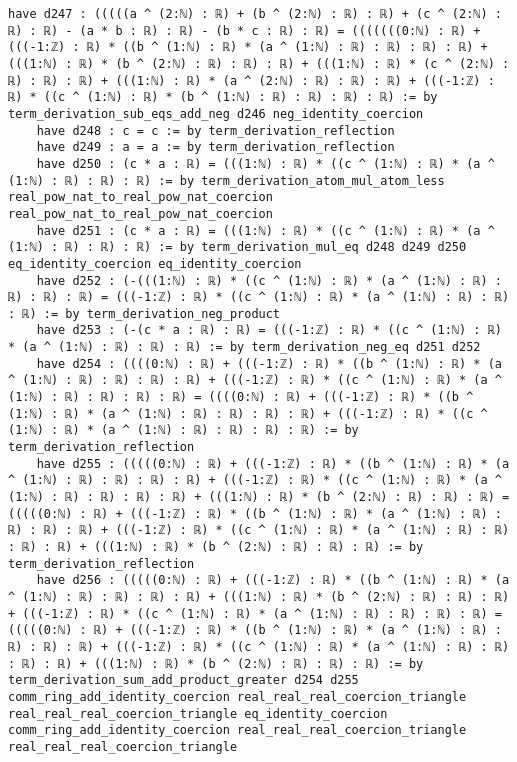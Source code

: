 \documentclass{article}
\begin{document}
\begin{tcolorbox}[colback=white!10, width=\linewidth]
\begin{lstlisting}[language=Lean4]
    have d247 : (((((a ^ (2:ℕ) : ℝ) + (b ^ (2:ℕ) : ℝ) : ℝ) + (c ^ (2:ℕ) : ℝ) : ℝ) - (a * b : ℝ) : ℝ) - (b * c : ℝ) : ℝ) = (((((((0:ℕ) : ℝ) + (((-1:ℤ) : ℝ) * ((b ^ (1:ℕ) : ℝ) * (a ^ (1:ℕ) : ℝ) : ℝ) : ℝ) : ℝ) + (((1:ℕ) : ℝ) * (b ^ (2:ℕ) : ℝ) : ℝ) : ℝ) + (((1:ℕ) : ℝ) * (c ^ (2:ℕ) : ℝ) : ℝ) : ℝ) + (((1:ℕ) : ℝ) * (a ^ (2:ℕ) : ℝ) : ℝ) : ℝ) + (((-1:ℤ) : ℝ) * ((c ^ (1:ℕ) : ℝ) * (b ^ (1:ℕ) : ℝ) : ℝ) : ℝ) : ℝ) := by term_derivation_sub_eqs_add_neg d246 neg_identity_coercion
    have d248 : c = c := by term_derivation_reflection
    have d249 : a = a := by term_derivation_reflection
    have d250 : (c * a : ℝ) = (((1:ℕ) : ℝ) * ((c ^ (1:ℕ) : ℝ) * (a ^ (1:ℕ) : ℝ) : ℝ) : ℝ) := by term_derivation_atom_mul_atom_less real_pow_nat_to_real_pow_nat_coercion real_pow_nat_to_real_pow_nat_coercion
    have d251 : (c * a : ℝ) = (((1:ℕ) : ℝ) * ((c ^ (1:ℕ) : ℝ) * (a ^ (1:ℕ) : ℝ) : ℝ) : ℝ) := by term_derivation_mul_eq d248 d249 d250 eq_identity_coercion eq_identity_coercion
    have d252 : (-(((1:ℕ) : ℝ) * ((c ^ (1:ℕ) : ℝ) * (a ^ (1:ℕ) : ℝ) : ℝ) : ℝ) : ℝ) = (((-1:ℤ) : ℝ) * ((c ^ (1:ℕ) : ℝ) * (a ^ (1:ℕ) : ℝ) : ℝ) : ℝ) := by term_derivation_neg_product
    have d253 : (-(c * a : ℝ) : ℝ) = (((-1:ℤ) : ℝ) * ((c ^ (1:ℕ) : ℝ) * (a ^ (1:ℕ) : ℝ) : ℝ) : ℝ) := by term_derivation_neg_eq d251 d252
    have d254 : ((((0:ℕ) : ℝ) + (((-1:ℤ) : ℝ) * ((b ^ (1:ℕ) : ℝ) * (a ^ (1:ℕ) : ℝ) : ℝ) : ℝ) : ℝ) + (((-1:ℤ) : ℝ) * ((c ^ (1:ℕ) : ℝ) * (a ^ (1:ℕ) : ℝ) : ℝ) : ℝ) : ℝ) = ((((0:ℕ) : ℝ) + (((-1:ℤ) : ℝ) * ((b ^ (1:ℕ) : ℝ) * (a ^ (1:ℕ) : ℝ) : ℝ) : ℝ) : ℝ) + (((-1:ℤ) : ℝ) * ((c ^ (1:ℕ) : ℝ) * (a ^ (1:ℕ) : ℝ) : ℝ) : ℝ) : ℝ) := by term_derivation_reflection
    have d255 : (((((0:ℕ) : ℝ) + (((-1:ℤ) : ℝ) * ((b ^ (1:ℕ) : ℝ) * (a ^ (1:ℕ) : ℝ) : ℝ) : ℝ) : ℝ) + (((-1:ℤ) : ℝ) * ((c ^ (1:ℕ) : ℝ) * (a ^ (1:ℕ) : ℝ) : ℝ) : ℝ) : ℝ) + (((1:ℕ) : ℝ) * (b ^ (2:ℕ) : ℝ) : ℝ) : ℝ) = (((((0:ℕ) : ℝ) + (((-1:ℤ) : ℝ) * ((b ^ (1:ℕ) : ℝ) * (a ^ (1:ℕ) : ℝ) : ℝ) : ℝ) : ℝ) + (((-1:ℤ) : ℝ) * ((c ^ (1:ℕ) : ℝ) * (a ^ (1:ℕ) : ℝ) : ℝ) : ℝ) : ℝ) + (((1:ℕ) : ℝ) * (b ^ (2:ℕ) : ℝ) : ℝ) : ℝ) := by term_derivation_reflection
    have d256 : (((((0:ℕ) : ℝ) + (((-1:ℤ) : ℝ) * ((b ^ (1:ℕ) : ℝ) * (a ^ (1:ℕ) : ℝ) : ℝ) : ℝ) : ℝ) + (((1:ℕ) : ℝ) * (b ^ (2:ℕ) : ℝ) : ℝ) : ℝ) + (((-1:ℤ) : ℝ) * ((c ^ (1:ℕ) : ℝ) * (a ^ (1:ℕ) : ℝ) : ℝ) : ℝ) : ℝ) = (((((0:ℕ) : ℝ) + (((-1:ℤ) : ℝ) * ((b ^ (1:ℕ) : ℝ) * (a ^ (1:ℕ) : ℝ) : ℝ) : ℝ) : ℝ) + (((-1:ℤ) : ℝ) * ((c ^ (1:ℕ) : ℝ) * (a ^ (1:ℕ) : ℝ) : ℝ) : ℝ) : ℝ) + (((1:ℕ) : ℝ) * (b ^ (2:ℕ) : ℝ) : ℝ) : ℝ) := by term_derivation_sum_add_product_greater d254 d255 comm_ring_add_identity_coercion real_real_real_coercion_triangle real_real_real_coercion_triangle eq_identity_coercion comm_ring_add_identity_coercion real_real_real_coercion_triangle real_real_real_coercion_triangle

\end{lstlisting}
\end{tcolorbox}
\end{document}
